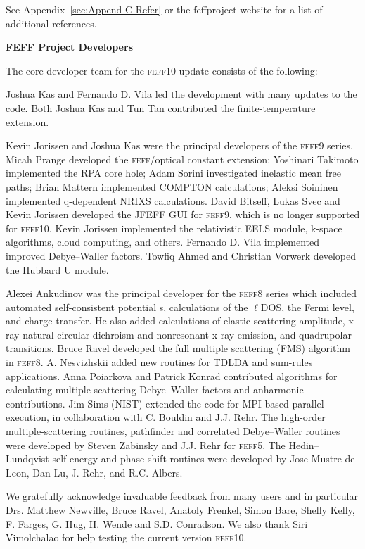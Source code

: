 \documentclass[11pt,oneside]{report} %
\newcommand{\feffcurrent}{\textsc{feff10}}
\newcommand{\program}[1]{\textsc{#1}}
\newcommand{\feff}{\program{feff}}
\begin{document}
\begin{latexonly}
See Appendix~\ref{sec:Append-C-Refer}  or the feffproject website for a list of additional references.

 
 

\medskip

{\bf FEFF Project Developers}

The core developer team for the {\feffcurrent} update consists of the following:

 Joshua Kas and Fernando D. Vila led the development with many updates to the code.  Both Joshua Kas and Tun Tan contributed the finite-temperature extension.

Kevin Jorissen and Joshua Kas were the principal developers of the {\feff}9 series. Micah Prange developed the {\feff}/optical constant extension; Yoshinari Takimoto implemented the RPA core hole; Adam Sorini investigated inelastic mean free paths; Brian Mattern implemented  COMPTON calculations; Aleksi Soininen implemented q-dependent NRIXS calculations. David Bitseff, Lukas Svec and Kevin Jorissen developed the JFEFF GUI for {\feff}9, which is no longer supported for {\feffcurrent}. Kevin Jorissen implemented the relativistic EELS module, k-space algorithms, cloud computing, and others. Fernando D. Vila implemented improved Debye--Waller factors. Towfiq Ahmed and Christian Vorwerk developed the Hubbard U module.

Alexei Ankudinov was the principal developer for the {\feff}8 series which included automated self-consistent potential s, calculations of the $\ell$DOS, the Fermi level, and charge transfer. He also added calculations of elastic scattering amplitude, x-ray natural circular dichroism and nonresonant x-ray emission, and quadrupolar transitions. Bruce Ravel developed the full multiple scattering (FMS) algorithm in {\feff}8. A. Nesvizhskii added new routines for TDLDA and sum-rules applications. Anna Poiarkova and Patrick Konrad contributed algorithms for calculating multiple-scattering Debye--Waller factors and anharmonic contributions. Jim Sims (NIST) extended the code for MPI based parallel execution, in collaboration with C. Bouldin and J.J. Rehr. The high-order multiple-scattering routines, pathfinder and correlated Debye--Waller routines were developed by Steven Zabinsky and J.J. Rehr for {\feff}5. The Hedin--Lundqvist self-energy and phase shift routines were developed by Jose Mustre de Leon, Dan Lu, J. Rehr, and R.C. Albers.

We gratefully acknowledge invaluable feedback from many users and in particular Drs. Matthew Newville, Bruce Ravel, Anatoly Frenkel, Simon Bare, Shelly Kelly, F. Farges, G. Hug, H. Wende and S.D. Conradson. We also thank Siri Vimolchalao for help testing the current version {\feffcurrent}.


\end{latexonly}
\end{document}

